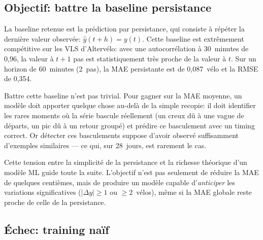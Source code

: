 \documentclass[fleqn, 12pt]{scrartcl}
\newcommand{\ent}{Altervélo}
\begin{document}
\subsection{Objectif: battre la baseline persistance}%
\label{ssec:baseline}


\vspace{0.3cm}

La baseline retenue est la prédiction par persistance, qui consiste à répéter la dernière valeur observée: $\hat{y}(t+h) = y(t)$.
%
Cette baseline est extrêmement compétitive sur les VLS d'\ent{}: avec une autocorrélation à 30~minutes de 0{,}96, la valeur à $t+1$ pas est statistiquement très proche de la valeur à $t$. Sur un horizon de 60~minutes (2~pas), la MAE persistante est de 0{,}087~vélo et la RMSE de 0{,}354.

\vspace{0.3cm}

Battre cette baseline n'est pas trivial. Pour gagner sur la MAE moyenne, un modèle doit apporter quelque chose au-delà de la simple recopie: il doit identifier les rares moments où la série bascule réellement (un creux dû à une vague de départs, un pic dû à un retour groupé) et prédire ce basculement avec un timing correct. Or détecter ces basculements suppose d'avoir observé suffisamment d'exemples similaires --- ce qui, sur 28~jours, est rarement le cas.

\vspace{0.3cm}

Cette tension entre la simplicité de la persistance et la richesse théorique d'un modèle ML guide toute la suite. L'objectif n'est pas seulement de réduire la MAE de quelques centièmes, mais de produire un modèle capable d'\emph{anticiper} les variations significatives ($|\Delta y| \geq 1$ ou $\geq 2$~vélos), même si la MAE globale reste proche de celle de la persistance.


\subsection{Échec: training naïf}%
\label{ssec:naif}

\end{document}
